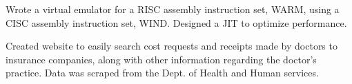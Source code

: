 \documentclass[]{deedy-resume-openfont}
\begin{document}
\begin{minipage}[t]{0.66\textwidth}
\begin{tightemize}
\item Wrote a virtual emulator for a RISC assembly instruction set, WARM, using a CISC assembly instruction set, WIND. Designed a JIT to optimize performance.
\end{tightemize}
\sectionsep

\begin{tightemize}
\item Created website to easily search cost requests and receipts made by doctors to insurance companies, along with other information regarding the doctor's practice. Data was scraped from the Dept. of Health and Human services.
\end{tightemize}

\end{minipage} 
\end{document}
